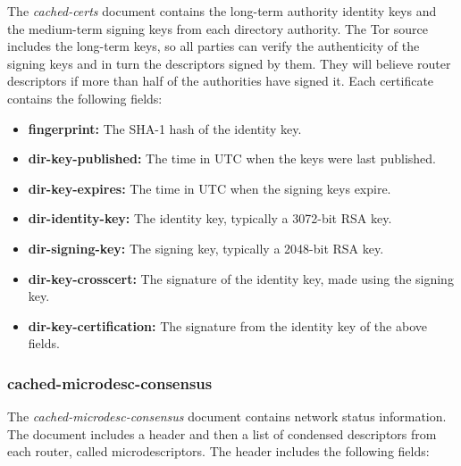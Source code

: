 The \emph{cached-certs} document contains the long-term authority identity keys and the medium-term signing keys from each directory authority. The Tor source includes the long-term keys, so all parties can verify the authenticity of the signing keys and in turn the descriptors signed by them. They will believe router descriptors if more than half of the authorities have signed it. Each certificate contains the following fields:

\begin{itemize}
	\item \textbf{fingerprint:} The SHA-1 hash of the identity key.
	\item \textbf{dir-key-published:} The time in UTC when the keys were last published.
	\item \textbf{dir-key-expires:} The time in UTC when the signing keys expire.
	\item \textbf{dir-identity-key:} The identity key, typically a 3072-bit RSA key.
	\item \textbf{dir-signing-key:} The signing key, typically a 2048-bit RSA key.
	\item \textbf{dir-key-crosscert:} The signature of the identity key, made using the signing key.
	\item \textbf{dir-key-certification:} The signature from the identity key of the above fields.
\end{itemize}

\subsubsection{cached-microdesc-consensus}

The \emph{cached-microdesc-consensus} document contains network status information. The document includes a header and then a list of condensed descriptors from each router, called microdescriptors. The header includes the following fields:

